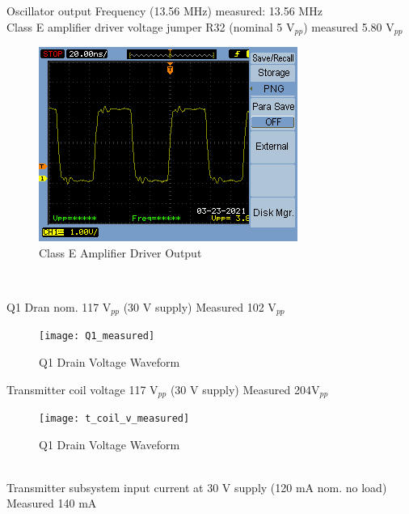 \documentclass[12pt]{article}
\begin{document}
\noindent
Oscillator output Frequency (13.56 MHz) measured: 13.56 MHz\\
Class E amplifier driver voltage jumper R32 (nominal 5 V$_{pp}$) measured 5.80 V$_{pp}$
\hfill
\begin{figure}[h!]
\centering
\includegraphics[width=0.8\linewidth]{osc_out}
\caption{Class E Amplifier Driver Output}
\end{figure}
\hfill \\
\pagebreak

\noindent
Q1 Dran nom. 117 V$_{pp}$ (30 V supply) Measured 102 V$_{pp}$
\hfill
\begin{figure}[h!]
\centering
\texttt{[image: Q1\_measured]}
\caption{Q1 Drain Voltage Waveform}
\end{figure}

\noindent
Transmitter coil voltage 117 V$_{pp}$ (30 V supply) Measured 204V$_{pp}$
\hfill
\begin{figure}[h!]
\centering
\texttt{[image: t\_coil\_v\_measured]}
\caption{Q1 Drain Voltage Waveform}
\end{figure}
\hfill 
\pagebreak
\hfill \\
\noindent
Transmitter subsystem input current at 30 V supply (120 mA nom. no load) Measured 140 mA
\end{document}
